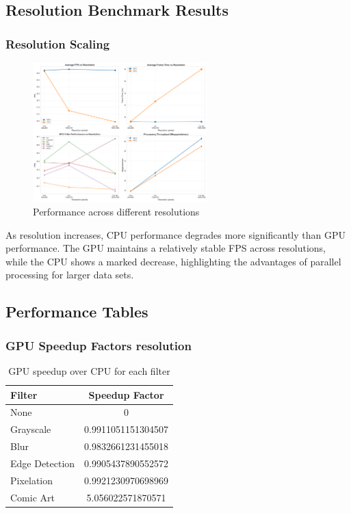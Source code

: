 \documentclass[12pt,a4paper]{article}
\begin{document}
\subsection{Resolution Benchmark Results}

\subsubsection{Resolution Scaling}
\begin{figure}[H]
    \centering
    \includegraphics[width=0.6\textwidth]{../data/plots/resolution_impact.png}
    \caption{Performance across different resolutions}
    \label{fig:resolution_impact}
\end{figure}
As resolution increases, CPU performance degrades more significantly than GPU performance. The GPU maintains a relatively stable FPS across resolutions, while the CPU shows a marked decrease, highlighting the advantages of parallel processing for larger data sets.

\subsection{Performance Tables}

\subsubsection{GPU Speedup Factors resolution}
\begin{table}[H]
    \centering
    \caption{GPU speedup over CPU for each filter}
    \label{tab:speedup}
    \begin{tabular}{lc}
        \toprule
        Filter & Speedup Factor \\
        \midrule
        None & 0 \\
        Grayscale & 0.9911051151304507 \\
        Blur & 0.9832661231455018 \\
        Edge Detection & 0.9905437890552572 \\
        Pixelation & 0.9921230970698969 \\
        Comic Art & 5.056022571870571 \\
        \bottomrule
    \end{tabular}
\end{table}
\end{document}
